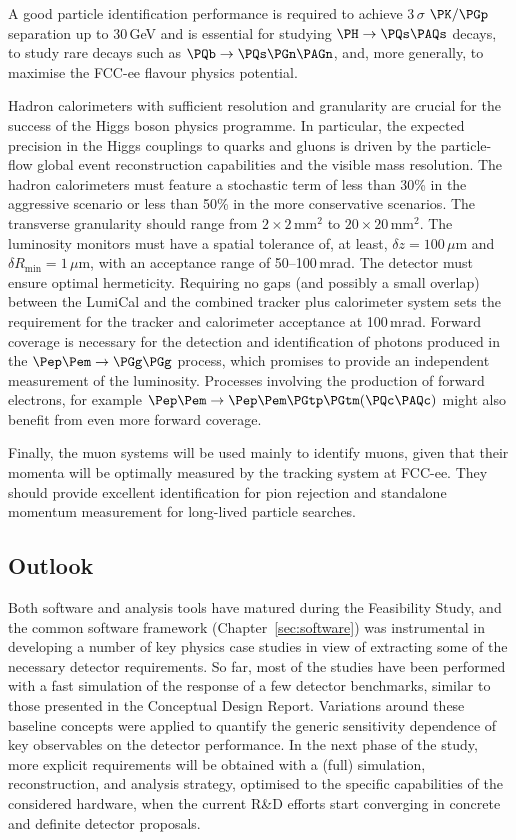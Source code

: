 A good particle identification performance is required to achieve 3\,$\sigma$ $\PK/\PGp$ separation up to 30\,GeV 
and is essential for studying $\PH \to \PQs\PAQs$ decays, to study rare decays such as $\PQb \to \PQs \PGn \PAGn$, and, more generally, to maximise the FCC-ee flavour physics potential.

Hadron calorimeters with sufficient resolution and granularity are crucial for the success of the Higgs boson physics programme. 
In particular, the expected precision in the Higgs couplings to quarks and gluons is driven by the particle-flow global event reconstruction capabilities and the visible mass resolution. 
The hadron calorimeters must feature a stochastic term of less than 30\% in the aggressive scenario or less than 50\% in the more conservative scenarios. 
The transverse granularity should range from $2 \times 2$\,mm$^2$ to $20 \times 20$\,mm$^2$. 
The luminosity monitors must have a spatial tolerance of, at least, $\delta z = 100$\,$\mu$m and $\delta R_\text{min} = 1$\,$\mu$m, with an acceptance range of 50--100\,mrad. 
The detector must ensure optimal hermeticity. 
Requiring no gaps (and possibly a small overlap) between the LumiCal and the combined tracker plus calorimeter system 
sets the requirement for the tracker and calorimeter acceptance at 100\,mrad. 
Forward coverage is necessary for the detection and identification of photons produced in the $\epem \to \PGg \PGg$ process, 
which promises to provide an independent measurement of the luminosity. 
Processes involving the production of forward electrons, for example $\epem \to \epem \PGtp \PGtm (\PQc\PAQc)$ might also benefit from even more forward coverage.

Finally, the muon systems will be used mainly to identify muons, given that their momenta will be optimally measured by the tracking system at FCC-ee. 
They should provide excellent identification for pion rejection and standalone momentum measurement for long-lived particle searches. 

\subsection{Outlook}

Both software and analysis tools have matured during the Feasibility Study, 
and the common software framework (Chapter~\ref{sec:software}) was instrumental 
in developing a number of key physics case studies in view of extracting some of the necessary detector requirements. 
So far, most of the studies have been
performed with a fast simulation of the response of a few detector benchmarks, 
similar to those presented in the Conceptual Design Report. 
Variations around these baseline concepts were applied 
to quantify the generic sensitivity dependence of key observables on the detector performance. 
In the next phase of the study, 
more explicit requirements will be obtained with a (full) simulation, reconstruction, and analysis strategy, 
optimised to the specific capabilities of the considered hardware, 
when the current R\&D efforts start converging in concrete and definite detector proposals. 

